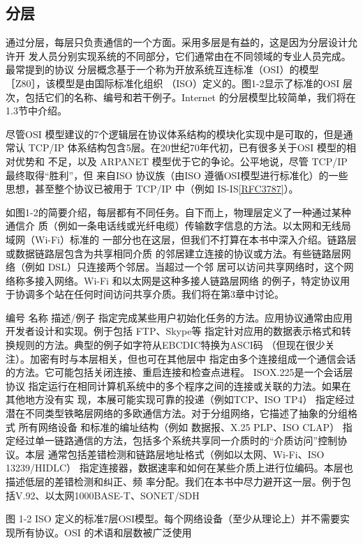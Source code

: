 \subsection{分层}
通过分层，每层只负责通信的一个方面。采用多层是有益的，这是因为分层设计允许开
发人员分别实现系统的不同部分，它们通常由在不同领域的专业人员完成。最常提到的协议
分层概念基于一个称为开放系统互连标准（OSI）的模型［Z80］，该模型是由国际标准化组织
（ISO）定义的。图1-2显示了标准的OSI 层次，包括它们的名称、编号和若干例子。Internet
的分层模型比较简单，我们将在1.3节中介绍。

尽管OSI 模型建议的7个逻辑层在协议体系结构的模块化实现中是可取的，但是通常认
TCP/IP 体系结构包含5层。在20世纪70年代初，已有很多关于OSI 模型的相对优势和
不足，以及 ARPANET 模型优于它的争论。公平地说，尽管 TCP/IP 最终取得“胜利”，但
来自ISO 协议族（由ISO 遵循OSI模型进行标准化）的一些思想，甚至整个协议已被用于
TCP/IP 中（例如 IS-IS\href{https://www.rfc-editor.org/rfc/rfc3787}{[RFC3787]}）。

如图1-2的简要介绍，每层都有不同任务。自下而上，物理层定义了一种通过某种通信介
质（例如一条电话线或光纤电缆）传输数字信息的方法。以太网和无线局域网（Wi-Fi）标准的
一部分也在这层，但我们不打算在本书中深入介绍。链路层或数据链路层包含为共享相同介质
的邻居建立连接的协议或方法。有些链路层网络（例如 DSL）只连接两个邻居。当超过一个邻
居可以访问共享网络时，这个网络称多接入网络。Wi-Fi 和以太网是这种多接人链路层网络
的例子，特定协议用于协调多个站在任何时间访问共享介质。我们将在第3章中讨论。

编号
名称
描述/例子
指定完成某些用户初始化任务的方法。应用协议通常由应用开发者设计和实现。例于包括
FTP、Skype等
指定针对应用的数据表示格式和转换规则的方法。典型的例子如字符从EBCDIC特换为ASCI码
（但现在很少关注）。加密有时与本层相关，但也可在其他层中
指定由多个连接组成一个通信会话的方法。它可能包括关闭连接、重启连接和检查点进程。
ISOX.225是一个会话层协议
指定运行在相同计算机系统中的多个程序之间的连接或关联的力法。如果在其他地方没有实
现，本展可能实现可靠的投递（例如TCP、ISO TP4）
指定经过潜在不同类型铁略层网络的多欧通信方法。对于分组网络，它描述了抽象的分组格式
所有网络设备
和标准的编址结构（例如 数据报、X.25 PLP、ISO CLAP）
指定经过单一链路通信的方法，包括多个系统共享同一介质时的“介质访问”控制协议。本层
通常包括差错检测和链路层地址格式（例如以太网、Wi-Fi、ISO 13239/HIDLC）
指定连接器，数据速率和如何在某些介质上进行位编码。本层也描述低层的差错检测和纠正、频
率分配。我们在本书中尽力避开这一层。例于包括V.92、以太网1000BASE-T、SONET/SDH

图 1-2
ISO 定义的标准7层OSI模型。每个网络设备（至少从理论上）并不需要实现所有协议。OSI
的术语和层数被广泛使用

